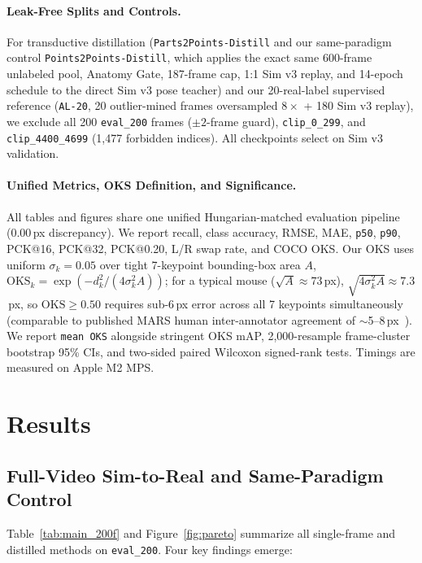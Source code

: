 \documentclass[10pt,twocolumn,letterpaper]{article}
\begin{document}
\paragraph{Leak-Free Splits and Controls.} For transductive distillation (\texttt{Parts2Points-Distill} and our same-paradigm control \texttt{Points2Points-Distill}, which applies the exact same 600-frame unlabeled pool, Anatomy Gate, 187-frame cap, 1:1 Sim v3 replay, and 14-epoch schedule to the direct Sim v3 pose teacher) and our 20-real-label supervised reference (\texttt{AL-20}, 20 outlier-mined frames oversampled $8\times$ + 180 Sim v3 replay), we exclude all 200 \texttt{eval\_200} frames ($\pm 2$-frame guard), \texttt{clip\_0\_299}, and \texttt{clip\_4400\_4699} (1,477 forbidden indices). All checkpoints select on Sim v3 validation.

\paragraph{Unified Metrics, OKS Definition, and Significance.} All tables and figures share one unified Hungarian-matched evaluation pipeline (0.00\,px discrepancy). We report recall, class accuracy, RMSE, MAE, \texttt{p50}, \texttt{p90}, PCK@16, PCK@32, PCK@0.20, L/R swap rate, and COCO OKS. Our OKS uses uniform $\sigma_k=0.05$ over tight 7-keypoint bounding-box area $A$, $\mathrm{OKS}_k=\exp(-d_k^2/(4\sigma_k^2 A))$; for a typical mouse ($\sqrt{A}\approx 73$\,px), $\sqrt{4\sigma_k^2 A}\approx 7.3$\,px, so $\mathrm{OKS}\ge 0.50$ requires sub-6\,px error across all 7 keypoints simultaneously (comparable to published MARS human inter-annotator agreement of $\sim$5--8\,px~\cite{segalin2021mars}). We report \texttt{mean OKS} alongside stringent OKS mAP, 2,000-resample frame-cluster bootstrap 95\% CIs, and two-sided paired Wilcoxon signed-rank tests. Timings are measured on Apple M2 MPS.

\section{Results}

\subsection{Full-Video Sim-to-Real and Same-Paradigm Control}

Table~\ref{tab:main_200f} and Figure~\ref{fig:pareto} summarize all single-frame and distilled methods on \texttt{eval\_200}. Four key findings emerge:
\end{document}
